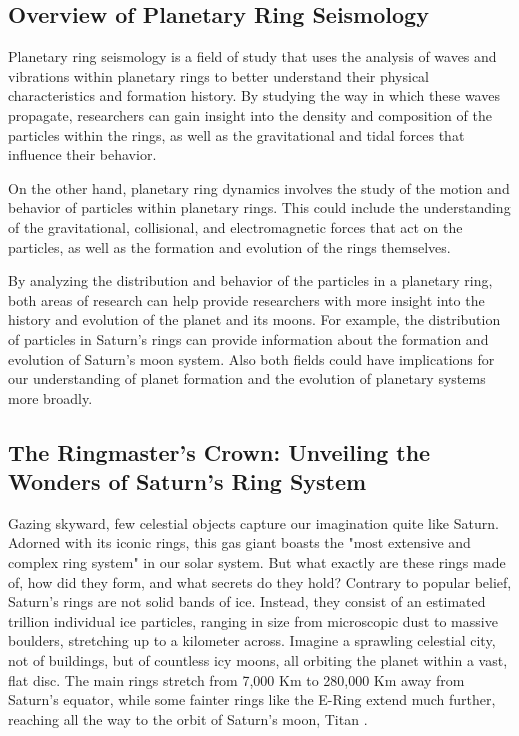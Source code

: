 \documentclass{article}
\begin{document}




\subsection{Overview of Planetary Ring Seismology}

Planetary ring seismology is a field of study that uses the analysis of waves and vibrations within planetary rings to better understand their physical characteristics and formation history. By studying the way in which these waves propagate, researchers can gain insight into the density and composition of the particles within the rings, as well as the gravitational and tidal forces that influence their behavior.

On the other hand, planetary ring dynamics involves the study of the motion and behavior of particles within planetary rings. This could include the understanding of the gravitational, collisional, and electromagnetic forces that act on the particles, as well as the formation and evolution of the rings themselves.

By analyzing the distribution and behavior of the particles in a planetary ring, both areas of research can help provide researchers with more insight into the history and evolution of the planet and its moons. For example, the distribution of particles in Saturn's rings can provide information about the formation and evolution of Saturn's moon system. Also both fields could have implications for our understanding of planet formation and the evolution of planetary systems more broadly.


\subsection{The Ringmaster's Crown: Unveiling the Wonders of Saturn's Ring System}

Gazing skyward, few celestial objects capture our imagination quite like Saturn. Adorned with its iconic rings, this gas giant boasts the "most extensive and complex ring system" in our solar system. But what exactly are these rings made of, how did they form, and what secrets do they hold? Contrary to popular belief, Saturn's rings are not solid bands of ice. Instead, they consist of an estimated trillion individual ice particles, ranging in size from microscopic dust to massive boulders, stretching up to a kilometer across. Imagine a sprawling celestial city, not of buildings, but of countless icy moons, all orbiting the planet within a vast, flat disc. The main rings stretch from 7,000 Km to 280,000 Km away from Saturn's equator, while some fainter rings like the E-Ring extend much further, reaching all the way to the orbit of Saturn's moon, Titan \cite{enwiki:1201721965}.
\end{document}
